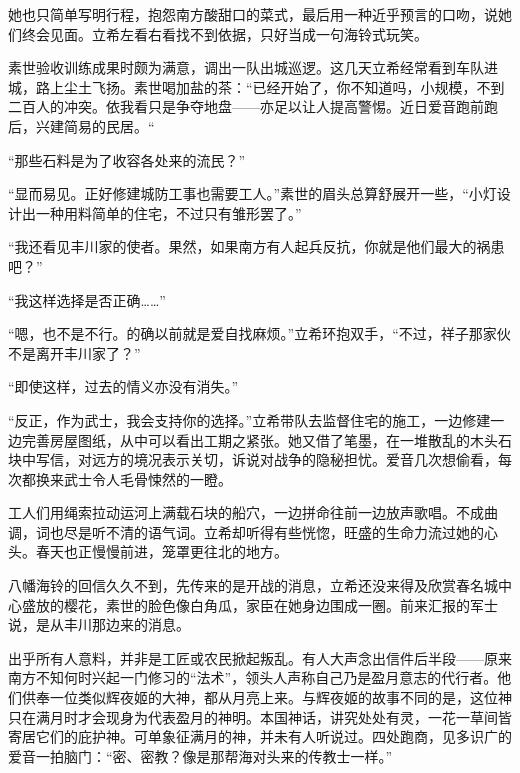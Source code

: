 \documentclass{article}
\begin{document}
她也只简单写明行程，抱怨南方酸甜口的菜式，最后用一种近乎预言的口吻，说她们终会见面。立希左看右看找不到依据，只好当成一句海铃式玩笑。



素世验收训练成果时颇为满意，调出一队出城巡逻。这几天立希经常看到车队进城，路上尘土飞扬。素世喝加盐的茶：“已经开始了，你不知道吗，小规模，不到二百人的冲突。依我看只是争夺地盘——亦足以让人提高警惕。近日爱音跑前跑后，兴建简易的民居。“



“那些石料是为了收容各处来的流民？”



“显而易见。正好修建城防工事也需要工人。”素世的眉头总算舒展开一些，“小灯设计出一种用料简单的住宅，不过只有雏形罢了。”



“我还看见丰川家的使者。果然，如果南方有人起兵反抗，你就是他们最大的祸患吧？”



“我这样选择是否正确……”



“嗯，也不是不行。的确以前就是爱自找麻烦。”立希环抱双手，“不过，祥子那家伙不是离开丰川家了？”



“即使这样，过去的情义亦没有消失。”



“反正，作为武士，我会支持你的选择。”立希带队去监督住宅的施工，一边修建一边完善房屋图纸，从中可以看出工期之紧张。她又借了笔墨，在一堆散乱的木头石块中写信，对远方的境况表示关切，诉说对战争的隐秘担忧。爱音几次想偷看，每次都换来武士令人毛骨悚然的一瞪。



工人们用绳索拉动运河上满载石块的船穴，一边拼命往前一边放声歌唱。不成曲调，词也尽是听不清的语气词。立希却听得有些恍惚，旺盛的生命力流过她的心头。春天也正慢慢前进，笼罩更往北的地方。



八幡海铃的回信久久不到，先传来的是开战的消息，立希还没来得及欣赏春名城中心盛放的樱花，素世的脸色像白角瓜，家臣在她身边围成一圈。前来汇报的军士说，是从丰川那边来的消息。



出乎所有人意料，并非是工匠或农民掀起叛乱。有人大声念出信件后半段——原来南方不知何时兴起一门修习的“法术”，领头人声称自己乃是盈月意志的代行者。他们供奉一位类似辉夜姬的大神，都从月亮上来。与辉夜姬的故事不同的是，这位神只在满月时才会现身为代表盈月的神明。本国神话，讲究处处有灵，一花一草间皆寄居它们的庇护神。可单象征满月的神，并未有人听说过。四处跑商，见多识广的爱音一拍脑门：“密、密教？像是那帮海对头来的传教士一样。”
\end{document}
